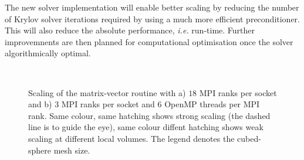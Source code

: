 \documentclass[review,times]{elsarticle}
\begin{document}
The new solver implementation will enable better scaling by reducing
the number of Krylov solver iterations required by using a much more
efficient preconditioner. This will also reduce the absolute
performance, {\em i.e.} run-time. Further improvemnents are then
planned for computational optimisation once the solver algorithmically
optimal.

\begin{figure}
  \begin{center}
    \\
    \caption{\label{fig:OMP_scale}Scaling of the matrix-vector routine 
      with a) $18$ MPI ranks per socket and b) $3$ MPI ranks per
      socket and $6$ OpenMP threads per MPI rank. Same colour, same
      hatching shows strong scaling (the dashed line is to guide the
      eye), same colour diffent hatching shows weak scaling at
      different local volumes. The legend denotes the cubed-sphere
      mesh size.}
  \end{center}
\end{figure}
\end{document}
